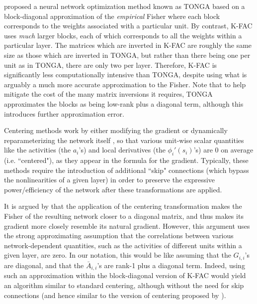 \documentclass[12pt]{article}
\newcommand{\acronym}{K-FAC}
\begin{document}

\citet{TONGA} proposed a neural network optimization method known as TONGA based on a block-diagonal approximation of the \emph{empirical} Fisher where each block corresponds to the weights associated with a particular unit.  By contrast, \acronym{} uses \emph{much} larger blocks, each of which corresponds to all the weights within a particular layer.  The matrices which are inverted in \acronym{} are roughly the same size as those which are inverted in TONGA, but rather than there being one per unit as in TONGA, there are only two per layer. Therefore, \acronym{} is significantly less computationally intensive than TONGA, despite using what is arguably a much more accurate approximation to the Fisher.  Note that to help mitigate the cost of the many matrix inversions it requires, TONGA approximates the blocks as being low-rank plus a diagonal term, although this introduces further approximation error.

Centering methods work by either modifying the gradient \citep{Schraudolph_centering} or dynamically reparameterizing the network itself \citep{Tapani_centering, Vatanen_centering, Wiesler_centering}, so that various unit-wise scalar quantities like the activities (the $a_i$'s) and local derivatives (the $\phi_i'(s_i)$'s) %
are 0 on average (i.e. ``centered"), as they appear in the formula for the gradient.  Typically, these methods require the introduction of additional ``skip" connections (which bypass the nonlinearities of a given layer) in order to preserve the expressive power/efficiency of the network after these transformations are applied.

It is argued by \citet{Tapani_centering} that the application of the centering transformation makes the Fisher of the resulting network closer to a diagonal matrix, and thus makes its gradient more closely resemble its natural gradient.  However, this argument uses the strong approximating assumption that the correlations between various network-dependent quantities, such as the activities of different units within a given layer, are zero.  In our notation, this would be like assuming that the $G_{i,i}$'s are diagonal, and that the $\bar{A}_{i,i}$'s are rank-1 plus a diagonal term.  Indeed, using such an approximation within the block-diagonal version of \acronym{} would yield an algorithm similar to standard centering, although without the need for skip connections (and hence similar to the version of centering proposed by \citet{Wiesler_centering}).
\end{document}
